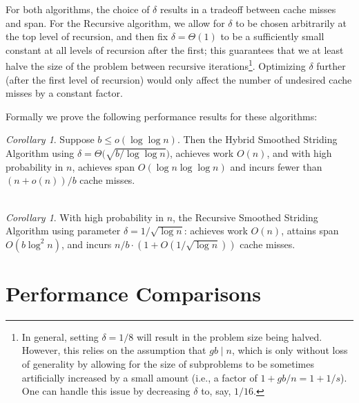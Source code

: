 \documentclass[sigconf, 10pt, nonacm]{acmart}
\theoremstyle{remark}
\newtheorem{corollary}[thm]{Corollary}
\theoremstyle{remark}
\begin{document}
For both algorithms, the choice of $\delta$ results in a tradeoff between cache
misses and span. For the Recursive algorithm, we allow for $\delta$ to be
chosen arbitrarily at the top level of recursion, and then fix $\delta  =
\Theta(1)$ to be a sufficiently small constant at all levels of recursion after
the first; this guarantees that we at least halve the size of the problem
between recursive iterations\footnote{In general, setting $\delta = 1/8$ will
result in the problem size being halved. However, this relies on the assumption
that $gb \mid n$, which is only without loss of generality by allowing for the
size of subproblems to be sometimes artificially increased by a small amount
(i.e., a factor of $1 + gb / n = 1 + 1/s$). One can handle this issue by
decreasing $\delta$ to, say, $1/16$.}. Optimizing $\delta$ further (after the
first level of recursion) would only affect the number of undesired cache
misses by a constant factor.

Formally we prove the following performance results for these algorithms:
\begin{corollary}
	\label{cor:fullPartition}
Suppose $b \le o(\log \log n)$. Then the Hybrid Smoothed Striding Algorithm using $\delta = \Theta\big(\sqrt{b/\log\log n}\big)$, achieves work $O(n)$, and with high probability in $n$, achieves span $O(\log n \log\log n)$ and incurs fewer than $(n+o(n))/b$ cache misses.\\\\
\end{corollary}

\begin{corollary}
  \label{cor:groupedPartitionAlg}
	With high probability in $n$, the Recursive Smoothed Striding Algorithm using parameter $\delta=1/\sqrt{\log n}$:
  achieves work $O(n)$, attains span $O(b\log^2 n)$, and incurs $n/b \cdot (1 + O(1 / \sqrt{\log n}))$ cache misses. 
\end{corollary}

\section{Performance Comparisons}\label{secexp}


\end{document}
